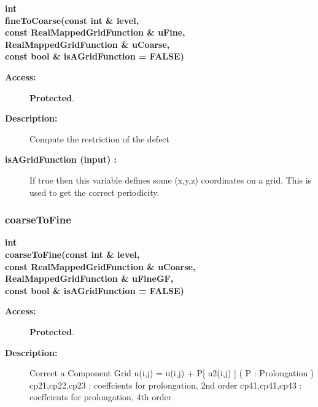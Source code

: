 \begin{flushleft} \textbf{%
int  \\ 
\settowidth{\EllipticGridGeneratorIncludeArgIndent}{fineToCoarse(}%
fineToCoarse(const int \& level, \\ 
\hspace{\EllipticGridGeneratorIncludeArgIndent}const RealMappedGridFunction \& uFine, \\ 
\hspace{\EllipticGridGeneratorIncludeArgIndent}RealMappedGridFunction \& uCoarse,\\ 
\hspace{\EllipticGridGeneratorIncludeArgIndent}const bool \& isAGridFunction  = FALSE)
}\end{flushleft}
\begin{description}
\item[{\bf Access:}]  {\bf Protected}.
\item[{\bf Description:}] 
   Compute the restriction of the defect
\item[{\bf isAGridFunction (input) :}]  If true then this variable defines some (x,y,z) coordinates on a grid.
    This is used to get the correct periodicity.
\end{description}
\subsubsection{coarseToFine}
 
\begin{flushleft} \textbf{%
int  \\ 
\settowidth{\EllipticGridGeneratorIncludeArgIndent}{coarseToFine(}%
coarseToFine(const int \& level,  \\ 
\hspace{\EllipticGridGeneratorIncludeArgIndent}const RealMappedGridFunction \& uCoarse, \\ 
\hspace{\EllipticGridGeneratorIncludeArgIndent}RealMappedGridFunction \& uFineGF,\\ 
\hspace{\EllipticGridGeneratorIncludeArgIndent}const bool \& isAGridFunction  = FALSE)
}\end{flushleft}
\begin{description}
\item[{\bf Access:}]  {\bf Protected}.
\item[{\bf Description:}] 
             Correct a Component Grid
      u(i,j) = u(i,j) + P[ u2(i,j) ]   ( P : Prolongation )
  cp21,cp22,cp23 : coeffcients for prolongation, 2nd order
  cp41,cp41,cp43 : coeffcients for prolongation, 4th order

\end{description}
